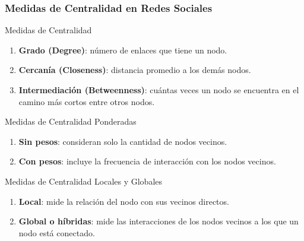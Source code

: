 \documentclass{beamer}
\begin{document}
\begin{frame}
	\frametitle{Medidas de Centralidad en Redes Sociales}

\begin{block}{Medidas de Centralidad}
	\begin{enumerate}
	\item \textbf{Grado (Degree)}: número de enlaces que tiene un nodo. 
	
	\item \textbf{Cercanía (Closeness)}: distancia promedio a los demás nodos. 
	
	\item \textbf{Intermediación (Betweenness)}: cuántas veces un nodo se encuentra en el camino más cortos entre otros nodos.
	\end{enumerate}
\end{block}

\begin{block}{Medidas de Centralidad Ponderadas}
	\begin{enumerate}
		\item \textbf{Sin pesos}: consideran solo la cantidad de nodos vecinos.
		\item \textbf{Con pesos}: incluye la frecuencia de interacción con los nodos vecinos.
	\end{enumerate}
\end{block}

\begin{block}{Medidas de Centralidad Locales y Globales}
	\begin{enumerate}
		\item \textbf{Local}: mide la relación del nodo con sus vecinos directos.
		\item \textbf{Global o híbridas}: mide las interacciones de los nodos vecinos a los que un nodo está conectado.
	\end{enumerate}
\end{block}

	
\end{frame}
\end{document}
